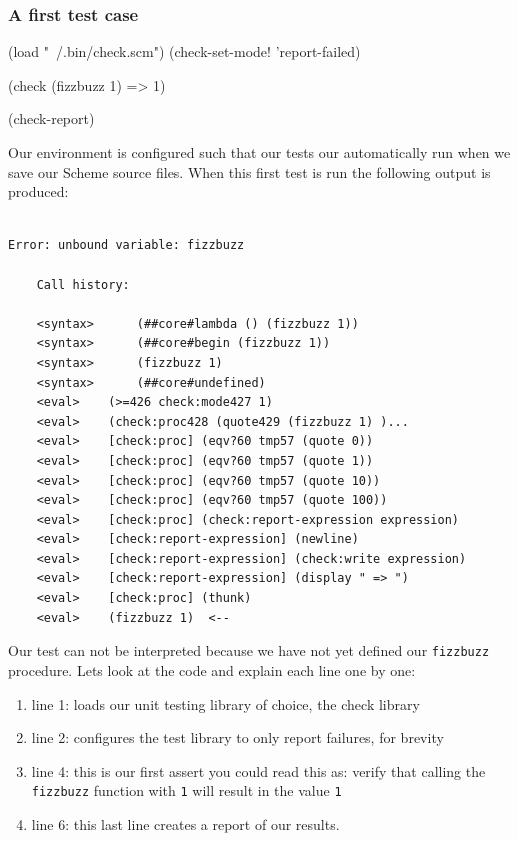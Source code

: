 \documentclass[12pt,a4paper,english,twoside]{article}
\begin{document}
\subsubsection{A first test case}
\begin{schemecode}
(load "~/.bin/check.scm")
(check-set-mode! 'report-failed)

(check (fizzbuzz 1) => 1)

(check-report)
\end{schemecode}
Our environment is configured such that our tests our automatically run when 
we save our Scheme source files. When this first test is run the following 
output is produced:
\begin{lstlisting}

Error: unbound variable: fizzbuzz

    Call history:

    <syntax>	  (##core#lambda () (fizzbuzz 1))
    <syntax>	  (##core#begin (fizzbuzz 1))
    <syntax>	  (fizzbuzz 1)
    <syntax>	  (##core#undefined)
    <eval>	  (>=426 check:mode427 1)
    <eval>	  (check:proc428 (quote429 (fizzbuzz 1) )...
    <eval>	  [check:proc] (eqv?60 tmp57 (quote 0))
    <eval>	  [check:proc] (eqv?60 tmp57 (quote 1))
    <eval>	  [check:proc] (eqv?60 tmp57 (quote 10))
    <eval>	  [check:proc] (eqv?60 tmp57 (quote 100))
    <eval>	  [check:proc] (check:report-expression expression)
    <eval>	  [check:report-expression] (newline)
    <eval>	  [check:report-expression] (check:write expression)
    <eval>	  [check:report-expression] (display " => ")
    <eval>	  [check:proc] (thunk)
    <eval>	  (fizzbuzz 1)	<--
\end{lstlisting}
Our test can not be interpreted because we have not yet defined our 
\texttt{fizzbuzz} procedure. Lets look at the code and explain each line 
one by one:

\begin{enumerate}
  \item line 1: loads our unit testing library of choice, the check library
  \item line 2: configures the test library to only report failures, for 
  brevity
  \item line 4: this is our first assert you could read this as: verify that calling 
    the \texttt{fizzbuzz} function with \texttt{1} will result in the value 
    \texttt{1}
 \item line 6: this last line creates a report of our results.
\end{enumerate}
\end{document}
